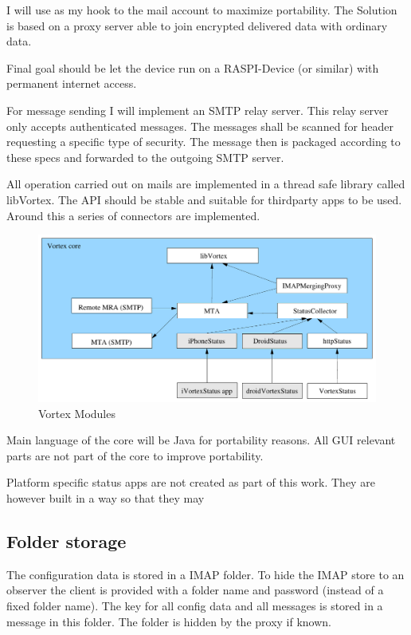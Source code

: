 I will use  as my hook to the mail account to maximize portability. The Solution is based on a  proxy server able to join encrypted delivered data with ordinary data.\par

Final goal should be let the device run on a RASPI-Device (or similar) with permanent internet access. \par

For message sending I will implement an SMTP relay server. This relay server only accepts authenticated messages. The messages shall be scanned for header requesting a specific type of security. The message then is packaged according to these specs and forwarded to the outgoing SMTP server.

All operation carried out on mails are implemented in a thread safe library called libVortex. The API should be stable and suitable for thirdparty apps to be used. Around this a series of connectors are implemented.

\begin{figure}[ht!]
  \centering\includegraphics[width=\textwidth]{inc/VortexModules}
  \caption{Vortex Modules}\label{fig:VortexModules}
\end{figure}

Main language of the core will be Java for portability reasons. All GUI relevant parts are not part of the core to improve portability.\par

Platform specific status apps are not created as part of this work. They are however built in a way so that they may

\subsection{Folder storage}
The configuration data is stored in a IMAP folder. To hide the IMAP store to an observer the client is provided with a folder name and password (instead of a fixed folder name). The key for all config data and all messages is stored in a message in this folder. The folder is hidden by the proxy if known.

